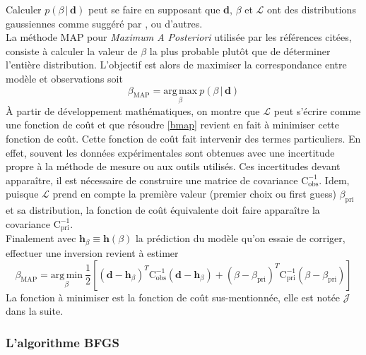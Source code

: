 \documentclass[a4paper,12pt]{article}
\newcommand{\bepar}[1]{
	\left( #1 \right)  
}
\newcommand{\becro}[1]{
	\left[ #1 \right]  
}
\newcommand{\covobs}{\text{C}^{-1}_{\text{obs}}}
\newcommand{\covpri}{\text{C}^{-1}_{\text{pri}}}
\newcommand{\bmap}{\beta_{\text{MAP}}}
\newcommand\bk{\color{black}}
\newcommand\dsb{\color{dsb}}
\numberwithin{equation}{section} %
\begin{document}
Calculer $p\bepar{\beta\,|\,\textbf{d}}$ peut se faire en supposant que \textbf{d}, $\beta$ et $\mathcal{L}$ ont des distributions gaussiennes comme suggéré par \citep{parish2016paradigm}, \citep{tarantola2005inverse} ou d'autres.\\
La méthode MAP pour \textit{Maximum A Posteriori} utilisée par les références citées, consiste à calculer la valeur de $\beta$ la plus probable plutôt que de déterminer l'entière distribution. L'objectif est alors de maximiser la correspondance entre modèle et observations soit 
\begin{equation}
\beta_{\text{MAP}} = \underset{\beta}{\text{arg}\, \text{max}} \ p\bepar{\beta\,|\,\textbf{d}} \label{bmap}
\end{equation}
\noindent À partir de développement mathématiques, on montre que $\mathcal{L}$ peut s'écrire comme une fonction de coût et que résoudre \eqref{bmap} revient en fait à minimiser cette fonction de coût. Cette fonction de coût fait intervenir des termes particuliers. En effet, souvent les données expérimentales sont obtenues avec une incertitude propre à la méthode de mesure ou aux outils utilisés. Ces incertitudes devant apparaître, il est nécessaire de construire une matrice de covariance $\covobs$.
Idem, puisque $\mathcal{L}$ prend en compte la première valeur (premier choix ou first guess) $\beta_{\text{pri}}$ et sa distribution, la fonction de coût équivalente doit faire apparaître la covariance $\covpri$.\\
Finalement avec $\textbf{h}_\beta \equiv \textbf{h}(\beta)$ la prédiction du modèle qu'on essaie de corriger, effectuer une inversion revient à estimer 
\begin{equation}
\bmap = \underset{\beta}{\text{arg}\, \text{min}}\ \frac{1}{2}\becro{\bepar{\textbf{d} - \textbf{h}_\beta}^T \covobs \bepar{\textbf{d} - \textbf{h}_\beta} + \bepar{\beta - \beta_{\text{pri}}}^T \covpri  \bepar{\beta - \beta_{\text{pri}}}} \label{bmapJ}
\end{equation}
La fonction à minimiser est la fonction de coût sus-mentionnée, elle est notée $\mathcal{J}$ dans la suite.

\dsb \subsubsection{L'algorithme BFGS} \bk
\end{document}
